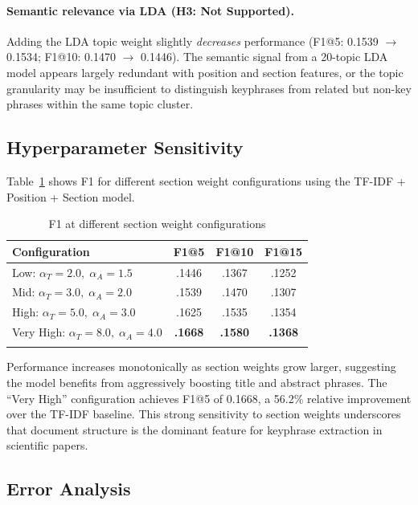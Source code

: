 \documentclass[pdflatex,sn-mathphys-num]{sn-jnl}
\begin{document}
\paragraph{Semantic relevance via LDA (H3: Not Supported).}
Adding the LDA topic weight slightly \emph{decreases} performance (F1@5: 0.1539 $\to$ 0.1534;
F1@10: 0.1470 $\to$ 0.1446). The semantic signal from a 20-topic LDA model appears largely redundant
with position and section features, or the topic granularity may be insufficient to distinguish
keyphrases from related but non-key phrases within the same topic cluster.

\subsection{Hyperparameter Sensitivity}\label{sec:sensitivity}

Table~\ref{tab:sensitivity} shows F1 for different section weight configurations using the
TF-IDF + Position + Section model.

\begin{table}[h]
\caption{F1 at different section weight configurations}\label{tab:sensitivity}
\begin{tabular*}{\textwidth}{@{\extracolsep\fill}lccc@{}}
\toprule
Configuration & F1@5 & F1@10 & F1@15 \\
\midrule
Low: $\alpha_T{=}2.0,\;\alpha_A{=}1.5$       & .1446 & .1367 & .1252 \\
Mid: $\alpha_T{=}3.0,\;\alpha_A{=}2.0$        & .1539 & .1470 & .1307 \\
High: $\alpha_T{=}5.0,\;\alpha_A{=}3.0$       & .1625 & .1535 & .1354 \\
Very High: $\alpha_T{=}8.0,\;\alpha_A{=}4.0$  & \textbf{.1668} & \textbf{.1580} & \textbf{.1368} \\
\botrule
\end{tabular*}
\end{table}

Performance increases monotonically as section weights grow larger, suggesting the model benefits
from aggressively boosting title and abstract phrases. The ``Very High'' configuration achieves
F1@5 of 0.1668, a 56.2\% relative improvement over the TF-IDF baseline. This strong sensitivity
to section weights underscores that document structure is the dominant feature for keyphrase
extraction in scientific papers.

\subsection{Error Analysis}\label{sec:errors}
\end{document}
